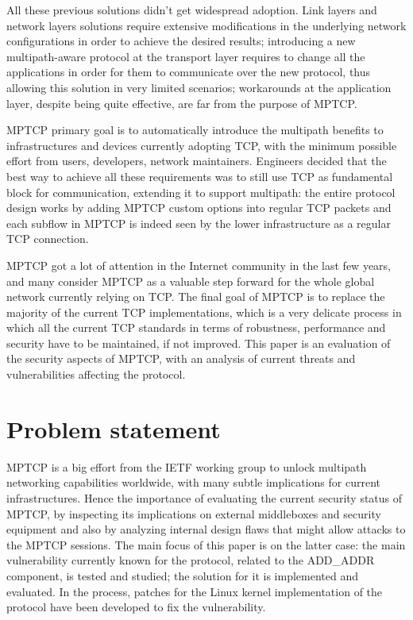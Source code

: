 \vspace{5mm}
All these previous solutions didn't get widespread adoption. Link layers and network layers solutions require extensive modifications in the underlying network configurations in order to achieve the desired results; introducing a new multipath-aware protocol at the transport layer requires to change all the applications in order for them to communicate over the new protocol, thus allowing this solution in very limited scenarios; workarounds at the application layer, despite being quite effective, are far from the purpose of MPTCP.


MPTCP primary goal is to automatically introduce the multipath benefits to infrastructures and devices currently adopting TCP, with the minimum possible effort from users, developers, network maintainers. Engineers decided that the best way to achieve all these requirements was to still use TCP as fundamental block for communication, extending it to support multipath: the entire protocol design works by adding MPTCP custom options into regular TCP packets and each subflow in MPTCP is indeed seen by the lower infrastructure as a regular TCP connection. 

MPTCP got a lot of attention in the Internet community in the last few years, and many consider MPTCP as a valuable step forward for the whole global network currently relying on TCP.
The final goal of MPTCP is to replace the majority of the current TCP implementations, which is a very delicate process in which all the current TCP standards in terms of robustness, performance and security have to be maintained, if not improved. This paper is an evaluation of the security aspects of MPTCP, with an analysis of current threats and vulnerabilities affecting the protocol.

\section{Problem statement}
MPTCP is a big effort from the IETF working group to unlock multipath networking capabilities worldwide, with many subtle implications for current infrastructures. Hence the importance of evaluating the current security status of MPTCP, by inspecting its implications on external middleboxes and security equipment and also by analyzing internal design flaws that might allow attacks to the MPTCP sessions. The main focus of this paper is on the latter case: the main vulnerability currently known for the protocol, related to the ADD\_ADDR component, is tested and studied; the solution for it is implemented and evaluated. In the process, patches for the Linux kernel implementation of the protocol have been developed to fix the vulnerability. 


